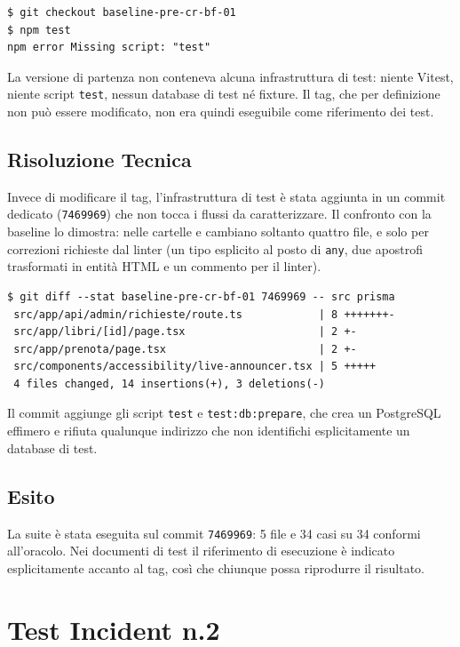 \documentclass[11pt,a4paper,oneside,openany]{book}
\begin{document}
\begin{lstlisting}
$ git checkout baseline-pre-cr-bf-01
$ npm test
npm error Missing script: "test"
\end{lstlisting}

La versione di partenza non conteneva alcuna infrastruttura di test: niente
Vitest, niente script \texttt{test}, nessun database di test né fixture. Il
tag, che per definizione non può essere modificato, non era quindi
eseguibile come riferimento dei test.

\subsection{Risoluzione Tecnica}

Invece di modificare il tag, l'infrastruttura di test è stata aggiunta in un
commit dedicato (\texttt{7469969}) che non tocca i flussi da caratterizzare.
Il confronto con la baseline lo dimostra: nelle cartelle  e
 cambiano soltanto quattro file, e solo per correzioni
richieste dal linter (un tipo esplicito al posto di \texttt{any}, due
apostrofi trasformati in entità HTML e un commento per il linter).

\begin{lstlisting}
$ git diff --stat baseline-pre-cr-bf-01 7469969 -- src prisma
 src/app/api/admin/richieste/route.ts            | 8 +++++++-
 src/app/libri/[id]/page.tsx                     | 2 +-
 src/app/prenota/page.tsx                        | 2 +-
 src/components/accessibility/live-announcer.tsx | 5 +++++
 4 files changed, 14 insertions(+), 3 deletions(-)
\end{lstlisting}

Il commit aggiunge gli script \texttt{test} e
\texttt{test:db:prepare}, che crea un PostgreSQL effimero e rifiuta qualunque
indirizzo che non identifichi esplicitamente un database di test.

\subsection{Esito}

La suite è stata eseguita sul commit \texttt{7469969}: 5 file e 34 casi su 34
conformi all'oracolo. Nei documenti di test il riferimento di esecuzione è
indicato esplicitamente accanto al tag, così che chiunque possa riprodurre il
risultato.

\section{Test Incident n.2}
\end{document}
